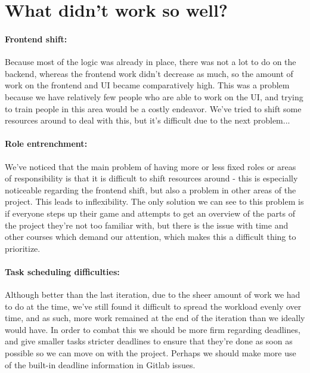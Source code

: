 \documentclass{article}
\begin{document}
\section*{What didn't work so well?}

\paragraph{Frontend shift:} Because most of the logic was already in place, there was not a lot to do on the backend, whereas the frontend work didn't decrease as much, so the amount of work on the frontend and UI became comparatively high. This was a problem because we have relatively few people who are able to work on the UI, and trying to train people in this area would be a costly endeavor. We've tried to shift some resources around to deal with this, but it's difficult due to the next problem...

\paragraph{Role entrenchment:} We've noticed that the main problem of having more or less fixed roles or areas of responsibility is that it is difficult to shift resources around - this is especially noticeable regarding the frontend shift, but also a problem in other areas of the project. This leads to inflexibility. The only solution we can see to this problem is if everyone steps up their game and attempts to get an overview of the parts of the project they're not too familiar with, but there is the issue with time and other courses which demand our attention, which makes this a difficult thing to prioritize.

\paragraph{Task scheduling difficulties:} Although better than the last iteration, due to the sheer amount of work we had to do at the time, we've still found it difficult to spread the workload evenly over time, and as such, more work remained at the end of the iteration than we ideally would have. In order to combat this we should be more firm regarding deadlines, and give smaller tasks stricter deadlines to ensure that they're done as soon as possible so we can move on with the project. Perhaps we should make more use of the built-in deadline information in Gitlab issues.
\end{document}
